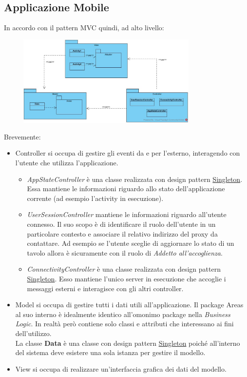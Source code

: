 \subsection{Applicazione Mobile}
In accordo con il pattern MVC quindi, ad alto livello:
\begin{figure}[H]
	\centering
	\includegraphics[width=0.8\textwidth]{Immagini/android_classdiagram.jpg}
\end{figure}
Brevemente:
\begin{itemize}
	\item Controller si occupa di gestire gli eventi da e per l'esterno, interagendo con l'utente che utilizza l'applicazione.
	\begin{itemize}
		\item \textit{AppStateController} è una classe realizzata con design pattern \underline{Singleton}. Essa mantiene le informazioni riguardo allo stato dell'applicazione corrente (ad esempio l'activity in esecuzione).
		\item \textit{UserSessionController} mantiene le informazioni riguardo all'utente connesso. Il suo scopo è di identificare il ruolo dell'utente in un particolare contesto e associare il relativo indirizzo del proxy da contattare. Ad esempio se l'utente sceglie di aggiornare lo stato di un tavolo allora è sicuramente con il ruolo di \textit{Addetto all'accoglienza}.
		\item \textit{ConnectivityController} è una classe realizzata con design pattern \underline{Singleton}. Esso mantiene l'unico server in esecuzione che accoglie i messaggi esterni e interagisce con gli altri controller.
	\end{itemize}
	\item Model si occupa di gestire tutti i dati utili all'applicazione. Il package Areas al suo interno è idealmente identico all'omonimo package nella \textit{Business Logic}. In realtà però contiene solo classi e attributi che interessano ai fini dell'utilizzo.
	\\La classe \textbf{Data} è una classe con design pattern \underline{Singleton} poiché all'interno del sistema deve esistere una sola istanza per gestire il modello.
	\item View si occupa di realizzare un'interfaccia grafica dei dati del modello.
\end{itemize}
